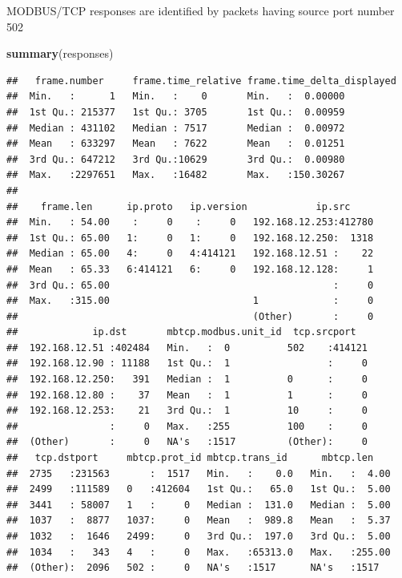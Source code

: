 \documentclass[]{article}
\newenvironment{Shaded}{\begin{snugshade}}{\end{snugshade}}
\newcommand{\KeywordTok}[1]{\textcolor[rgb]{0.13,0.29,0.53}{\textbf{{#1}}}}
\newcommand{\NormalTok}[1]{{#1}}
\begin{document}
MODBUS/TCP responses are identified by packets having source port number
502

\begin{Shaded}
\begin{Highlighting}[]
\KeywordTok{summary}\NormalTok{(responses)}
\end{Highlighting}
\end{Shaded}

\begin{verbatim}
##   frame.number     frame.time_relative frame.time_delta_displayed
##  Min.   :      1   Min.   :    0       Min.   :  0.00000         
##  1st Qu.: 215377   1st Qu.: 3705       1st Qu.:  0.00959         
##  Median : 431102   Median : 7517       Median :  0.00972         
##  Mean   : 633297   Mean   : 7622       Mean   :  0.01251         
##  3rd Qu.: 647212   3rd Qu.:10629       3rd Qu.:  0.00980         
##  Max.   :2297651   Max.   :16482       Max.   :150.30267         
##                                                                  
##    frame.len      ip.proto   ip.version            ip.src      
##  Min.   : 54.00    :     0    :     0   192.168.12.253:412780  
##  1st Qu.: 65.00   1:     0   1:     0   192.168.12.250:  1318  
##  Median : 65.00   4:     0   4:414121   192.168.12.51 :    22  
##  Mean   : 65.33   6:414121   6:     0   192.168.12.128:     1  
##  3rd Qu.: 65.00                                       :     0  
##  Max.   :315.00                         1             :     0  
##                                         (Other)       :     0  
##             ip.dst       mbtcp.modbus.unit_id  tcp.srcport    
##  192.168.12.51 :402484   Min.   :  0          502    :414121  
##  192.168.12.90 : 11188   1st Qu.:  1                 :     0  
##  192.168.12.250:   391   Median :  1          0      :     0  
##  192.168.12.80 :    37   Mean   :  1          1      :     0  
##  192.168.12.253:    21   3rd Qu.:  1          10     :     0  
##                :     0   Max.   :255          100    :     0  
##  (Other)       :     0   NA's   :1517         (Other):     0  
##   tcp.dstport     mbtcp.prot_id mbtcp.trans_id      mbtcp.len     
##  2735   :231563       :  1517   Min.   :    0.0   Min.   :  4.00  
##  2499   :111589   0   :412604   1st Qu.:   65.0   1st Qu.:  5.00  
##  3441   : 58007   1   :     0   Median :  131.0   Median :  5.00  
##  1037   :  8877   1037:     0   Mean   :  989.8   Mean   :  5.37  
##  1032   :  1646   2499:     0   3rd Qu.:  197.0   3rd Qu.:  5.00  
##  1034   :   343   4   :     0   Max.   :65313.0   Max.   :255.00  
##  (Other):  2096   502 :     0   NA's   :1517      NA's   :1517    

\end{verbatim}
\end{document}
